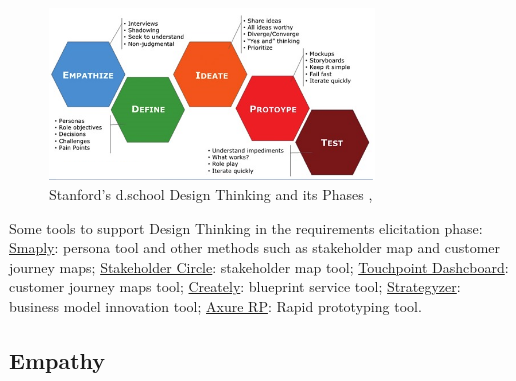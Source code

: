 \documentclass[conference]{IEEEtran}
\begin{document}
\begin{figure}[!htb]
    \centering
    \includegraphics[width=3.4in]{Figures/FigDR.png}
    \caption{Stanford’s d.school Design Thinking and its Phases \cite{DBLP:conf/hci/XimenesAA15},\cite{ DBLP:conf/icse/CarrollR16}}
    \label{fig:design_thinking_phases}
\end{figure}


Some tools to support Design Thinking in the requirements elicitation phase: \href{http://www.smaply.com}{Smaply}: persona tool and other methods such as stakeholder map and customer journey maps; \href{http://www.stakeholder-management.com/}{Stakeholder Circle}: stakeholder map tool; \href{http://www.touchpointdashboard.com}{Touchpoint Dashcboard}: customer journey maps tool; \href{http://www.creately.com}{Creately}: blueprint service tool; \href{http://www.strategyzer.com}{Strategyzer}: business model innovation tool; \href{http://www.axure.com/}{Axure RP}: Rapid prototyping tool.

\subsection{Empathy}
\end{document}
